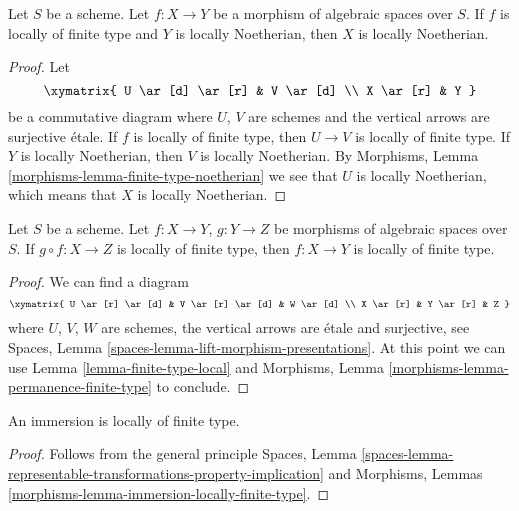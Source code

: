 \begin{lemma}
\label{lemma-locally-finite-type-locally-noetherian}
Let $S$ be a scheme.
Let $f : X \to Y$ be a morphism of algebraic spaces over $S$.
If $f$ is locally of finite type and $Y$ is locally Noetherian,
then $X$ is locally Noetherian.
\end{lemma}

\begin{proof}
Let
$$
\xymatrix{
U \ar[d] \ar[r] & V \ar[d] \\
X \ar[r] & Y
}
$$
be a commutative diagram where $U$, $V$ are schemes and the vertical arrows
are surjective \'etale. If $f$ is locally of finite type, then
$U \to V$ is locally of finite type. If $Y$ is locally Noetherian, then
$V$ is locally Noetherian. By
Morphisms, Lemma \ref{morphisms-lemma-finite-type-noetherian}
we see that $U$ is locally Noetherian, which means that $X$ is locally
Noetherian.
\end{proof}

\begin{lemma}
\label{lemma-permanence-finite-type}
Let $S$ be a scheme.
Let $f : X \to Y$, $g : Y \to Z$ be morphisms of algebraic spaces over $S$.
If $g \circ f : X \to Z$ is locally of finite type, then $f : X \to Y$
is locally of finite type.
\end{lemma}

\begin{proof}
We can find a diagram
$$
\xymatrix{
U \ar[r] \ar[d] & V \ar[r] \ar[d] & W \ar[d] \\
X \ar[r] & Y \ar[r] & Z
}
$$
where $U$, $V$, $W$ are schemes, the vertical arrows are \'etale and surjective,
see
Spaces, Lemma \ref{spaces-lemma-lift-morphism-presentations}.
At this point we can use
Lemma \ref{lemma-finite-type-local}
and
Morphisms, Lemma \ref{morphisms-lemma-permanence-finite-type}
to conclude.
\end{proof}

\begin{lemma}
\label{lemma-immersion-locally-finite-type}
An immersion is locally of finite type.
\end{lemma}

\begin{proof}
Follows from the general principle
Spaces, Lemma
\ref{spaces-lemma-representable-transformations-property-implication}
and
Morphisms, Lemmas \ref{morphisms-lemma-immersion-locally-finite-type}.
\end{proof}







